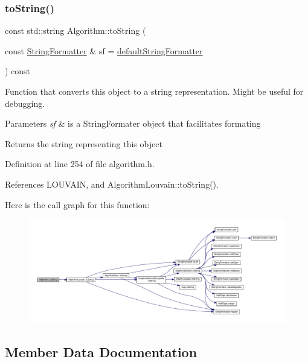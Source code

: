 \subsubsection{\texorpdfstring{to\+String()}{toString()}}
{\footnotesize\ttfamily const std\+::string Algorithm\+::to\+String (\begin{DoxyParamCaption}\item[{const \hyperlink{classStringFormatter}{String\+Formatter} \&}]{sf = {\ttfamily \hyperlink{stringFormatter_8h_abf1349c8e24162d0134072aff288f2a2}{default\+String\+Formatter}} }\end{DoxyParamCaption}) const\hspace{0.3cm}{\ttfamily [inline]}}

Function that converts this object to a string representation. Might be useful for debugging.


\begin{DoxyParams}{Parameters}
{\em sf} & is a String\+Formater object that facilitates formating \\
\hline
\end{DoxyParams}
\begin{DoxyReturn}{Returns}
the string representing this object 
\end{DoxyReturn}


Definition at line 254 of file algorithm.\+h.



References L\+O\+U\+V\+A\+IN, and Algorithm\+Louvain\+::to\+String().

Here is the call graph for this function\+:
\nopagebreak
\begin{figure}[H]
\begin{center}
\leavevmode
\includegraphics[width=350pt]{classAlgorithm_a3b3172af613b02bfb1dc2502553d91c0_cgraph}
\end{center}
\end{figure}


\subsection{Member Data Documentation}
\mbox{\label{classAlgorithm_a95ef62342279e55525eacf34e83bc2ca}} 
